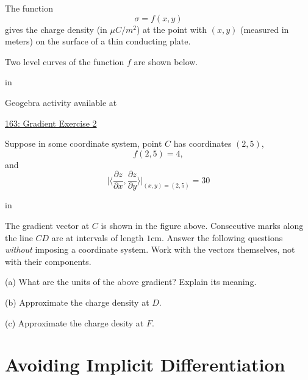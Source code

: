 \documentclass{ximera}
\newcommand{\pskip}{\vskip 0.1 in}
\begin{document}
\begin{question} \label{Q34gvbty}
The function 
\[
 \sigma = f(x,y)
\]
gives the charge density (in $\mu C/m^2$) at the point with $(x,y)$ (measured in meters) on the surface of a thin conducting plate.

Two level curves of the function $f$ are shown below.

\pskip

 
\begin{onlineOnly}
    \begin{center}
\end{center}
\end{onlineOnly}

Geogebra activity available at

\href{https://www.geogebra.org/classic/xnqmhyvd}{163: Gradient Exercise 2}


Suppose in some coordinate system, point $C$ has coordinates $(2,5)$,
\[
    f(2,5) = 4,
\]
and
\[
    \Big|  \langle \frac{\partial z}{\partial x}, \frac{\partial z}{\partial y} \rangle \Big|_{(x,y) =(2,5)} = 30
\]

\pskip

The gradient vector at $C$ is shown in the figure above. Consecutive marks along the line $CD$ are at intervals of length $1$cm. Answer the following questions \emph{without} imposing a coordinate system. Work with the vectors themselves, not with their components.

(a) What are the units of the above gradient? Explain its meaning.

(b) Approximate the charge density at $D$.

(c) Approximate the charge desity at $F$.



\end{question}


\section{Avoiding Implicit Differentiation}
\end{document}
